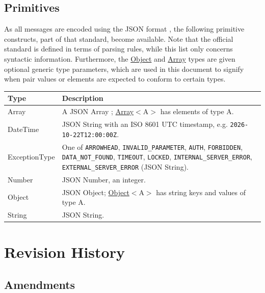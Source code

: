 \documentclass[a4paper]{arrowhead}
\newcommand{\pdef}[1]{{\textcolor{ArrowheadGrey}{#1 \label{sec:model:primitives:#1} \label{sec:model:primitives:#1s}}}}
\newcommand{\pref}[1]{{\textcolor{ArrowheadGrey}{\hyperref[sec:model:primitives:#1]{#1}}}}
\begin{document}
\subsection{Primitives}
\label{sec:model:primitives}

As all messages are encoded using the JSON format \cite{rfc8259}, the following primitive constructs, part of that standard, become available.
Note that the official standard is defined in terms of parsing rules, while this list only concerns syntactic information.
Furthermore, the \pref{Object} and \pref{Array} types are given optional generic type parameters, which are used in this document to signify when pair values or elements are expected to conform to certain types.

\noindent\begin{tabularx}{\textwidth}{| p{4.6cm} | X |} \hline
\rowcolor{gray!33} Type & Description \\ \hline
\pdef{Array} & A JSON Array \cite{rfc8259}; \pref{Array}$<$A$>$ has elements of type A. \\ \hline
\pdef{DateTime} & JSON String with an ISO 8601 UTC timestamp, e.g. \texttt{2026-10-22T12:00:00Z}. \\ \hline
\pdef{ExceptionType} & One of \texttt{ARROWHEAD}, \texttt{INVALID\_\allowbreak{}PARAMETER}, \texttt{AUTH}, \texttt{FORBIDDEN}, \texttt{DATA\_\allowbreak{}NOT\_\allowbreak{}FOUND}, \texttt{TIMEOUT}, \texttt{LOCKED}, \texttt{INTERNAL\_\allowbreak{}SERVER\_\allowbreak{}ERROR}, \texttt{EXTERNAL\_\allowbreak{}SERVER\_\allowbreak{}ERROR} (JSON String). \\ \hline
\pdef{Number} & JSON Number, an integer. \\ \hline
\pdef{Object} & JSON Object; \pref{Object}$<$A$>$ has string keys and values of type A. \\ \hline
\pdef{String} & JSON String. \\ \hline
\end{tabularx}

\newpage




\newpage

\section{Revision History}
\subsection{Amendments}
\end{document}
